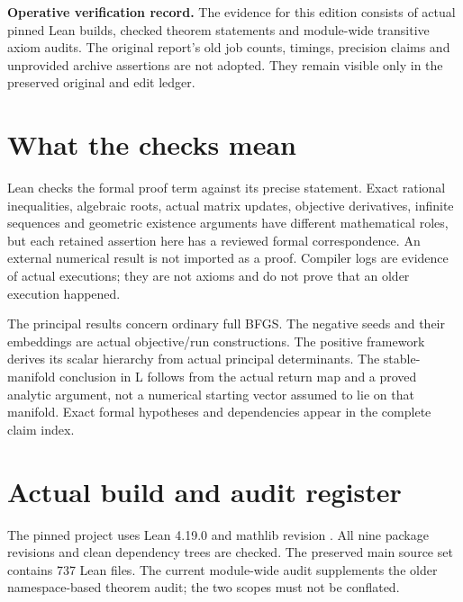 \textbf{Operative verification record.} The evidence for this edition consists of actual pinned Lean builds, checked theorem statements and module-wide transitive axiom audits. The original report's old job counts, timings, precision claims and unprovided archive assertions are not adopted. They remain visible only in the preserved original and edit ledger.

\section{What the checks mean}\label{what-the-checks-mean}

Lean checks the formal proof term against its precise statement. Exact rational inequalities, algebraic roots, actual matrix updates, objective derivatives, infinite sequences and geometric existence arguments have different mathematical roles, but each retained assertion here has a reviewed formal correspondence. An external numerical result is not imported as a proof. Compiler logs are evidence of actual executions; they are not axioms and do not prove that an older execution happened.

The principal results concern ordinary full BFGS. The negative seeds and their embeddings are actual objective/run constructions. The positive framework derives its scalar hierarchy from actual principal determinants. The stable-manifold conclusion in L follows from the actual return map and a proved analytic argument, not a numerical starting vector assumed to lie on that manifold. Exact formal hypotheses and dependencies appear in the complete claim index.

\section{Actual build and audit register}\label{fresh-execution-register}

The pinned project uses Lean 4.19.0 and mathlib revision
.
All nine package revisions and clean dependency trees are checked. The preserved main source set contains 737 Lean files. The current module-wide audit supplements the older namespace-based theorem audit; the two scopes must not be conflated.


